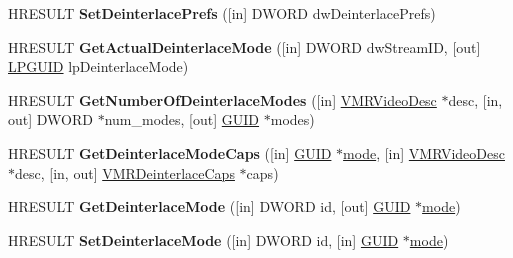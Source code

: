 \begin{DoxyCompactItemize}
\item 
\mbox{\label{interface_i_v_m_r_deinterlace_control_ade8ce153be98d46f87690ed363eb42d1}} 
H\+R\+E\+S\+U\+LT {\bfseries Set\+Deinterlace\+Prefs} (\mbox{[}in\mbox{]} D\+W\+O\+RD dw\+Deinterlace\+Prefs)
\item 
\mbox{\label{interface_i_v_m_r_deinterlace_control_a1ac3fd28011468f4650bfe6e871d103e}} 
H\+R\+E\+S\+U\+LT {\bfseries Get\+Actual\+Deinterlace\+Mode} (\mbox{[}in\mbox{]} D\+W\+O\+RD dw\+Stream\+ID, \mbox{[}out\mbox{]} \hyperlink{interface_g_u_i_d}{L\+P\+G\+U\+ID} lp\+Deinterlace\+Mode)
\item 
\mbox{\label{interface_i_v_m_r_deinterlace_control_a56b0cba4a80df6164c860b6039bfaaff}} 
H\+R\+E\+S\+U\+LT {\bfseries Get\+Number\+Of\+Deinterlace\+Modes} (\mbox{[}in\mbox{]} \hyperlink{struct___v_m_r_video_desc}{V\+M\+R\+Video\+Desc} $\ast$desc, \mbox{[}in, out\mbox{]} D\+W\+O\+RD $\ast$num\+\_\+modes, \mbox{[}out\mbox{]} \hyperlink{interface_g_u_i_d}{G\+U\+ID} $\ast$modes)
\item 
\mbox{\label{interface_i_v_m_r_deinterlace_control_a98ea40279f5496ac6074c6b3456dcedd}} 
H\+R\+E\+S\+U\+LT {\bfseries Get\+Deinterlace\+Mode\+Caps} (\mbox{[}in\mbox{]} \hyperlink{interface_g_u_i_d}{G\+U\+ID} $\ast$\hyperlink{interfacevoid}{mode}, \mbox{[}in\mbox{]} \hyperlink{struct___v_m_r_video_desc}{V\+M\+R\+Video\+Desc} $\ast$desc, \mbox{[}in, out\mbox{]} \hyperlink{struct___v_m_r_deinterlace_caps}{V\+M\+R\+Deinterlace\+Caps} $\ast$caps)
\item 
\mbox{\label{interface_i_v_m_r_deinterlace_control_a075440e1ba45f4579cd26686d3972744}} 
H\+R\+E\+S\+U\+LT {\bfseries Get\+Deinterlace\+Mode} (\mbox{[}in\mbox{]} D\+W\+O\+RD id, \mbox{[}out\mbox{]} \hyperlink{interface_g_u_i_d}{G\+U\+ID} $\ast$\hyperlink{interfacevoid}{mode})
\item 
\mbox{\label{interface_i_v_m_r_deinterlace_control_a7a6217c698fd0dea69374ecf6deb9ffb}} 
H\+R\+E\+S\+U\+LT {\bfseries Set\+Deinterlace\+Mode} (\mbox{[}in\mbox{]} D\+W\+O\+RD id, \mbox{[}in\mbox{]} \hyperlink{interface_g_u_i_d}{G\+U\+ID} $\ast$\hyperlink{interfacevoid}{mode})

\end{DoxyCompactItemize}
